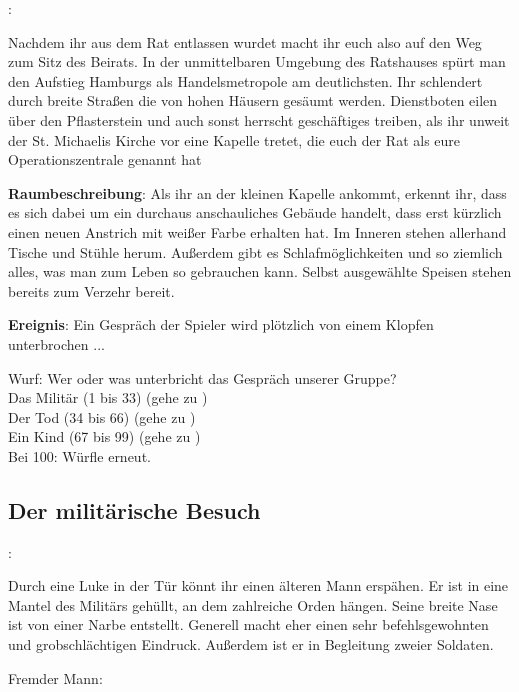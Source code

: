 
:

Nachdem ihr aus dem Rat entlassen wurdet macht ihr euch also auf den Weg zum Sitz des Beirats. In der unmittelbaren Umgebung des Ratshauses spürt man den Aufstieg Hamburgs als Handelsmetropole am deutlichsten. Ihr schlendert durch breite Straßen die von hohen Häusern gesäumt werden. Dienstboten eilen über den Pflasterstein und auch sonst herrscht geschäftiges treiben, als ihr unweit der St. Michaelis Kirche vor eine Kapelle tretet, die euch der Rat als eure Operationszentrale genannt hat

\textbf{Raumbeschreibung}: Als ihr an der kleinen Kapelle ankommt, erkennt ihr, dass es sich dabei um ein durchaus anschauliches Gebäude handelt, dass erst kürzlich einen neuen Anstrich mit weißer Farbe erhalten hat. Im Inneren stehen allerhand Tische und Stühle herum. Außerdem gibt es Schlafmöglichkeiten und so ziemlich alles, was man zum Leben so gebrauchen kann. Selbst ausgewählte Speisen stehen bereits zum Verzehr bereit.

\textbf{Ereignis}: Ein Gespräch der Spieler wird plötzlich von einem Klopfen unterbrochen ...

\begin{tcolorbox}
  Wurf: Wer oder was unterbricht das Gespräch unserer Gruppe? \\
  Das Militär (1 bis 33) (gehe zu \blue{\ref{militär}}) \\
  Der Tod (34 bis 66) (gehe zu \blue{\ref{tot}}) \\
  Ein Kind (67 bis 99) (gehe zu \blue{\ref{kind}}) \\
  Bei 100: Würfle erneut.
\end{tcolorbox}

\subsection{Der militärische Besuch}
\label{militär}

:

Durch eine Luke in der Tür könnt ihr einen älteren Mann erspähen. Er ist in eine Mantel des Militärs gehüllt, an dem zahlreiche Orden hängen. Seine breite Nase ist von einer Narbe entstellt. Generell macht eher einen sehr befehlsgewohnten und grobschlächtigen Eindruck. Außerdem ist er in Begleitung zweier Soldaten.

Fremder Mann:

